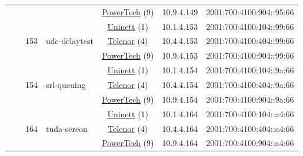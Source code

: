 \begin{small}
\begin{center}
\begin{longtable}{|c|c|c|c|c|c|c|c|}
  &  &  &  & \multicolumn{2}{|c|}{\tiny{\href{http://www.powertech.no}{PowerTech} (9)}} & \tiny{10.9.4.149} & \tiny{2001:700:4100:904::95:66} \\* \cline{3-3}\cline{4-4}\cline{5-5}\cline{6-6}\cline{7-7}\cline{8-8}
  &  & \multirow{3}{*}{\tiny{153}} & \multicolumn{1}{|l|}{\multirow{3}{*}{\tiny{ude-delaytest}}} & \multicolumn{2}{|c|}{\tiny{\href{https://www.uninett.no}{Uninett} (1)}} & \tiny{10.1.4.153} & \tiny{2001:700:4100:104::99:66} \\* \cline{5-5}\cline{6-6}\cline{7-7}\cline{8-8}
  &  &  &  & \multicolumn{2}{|c|}{\tiny{\href{https://www.telenor.no}{Telenor} (4)}} & \tiny{10.4.4.153} & \tiny{2001:700:4100:404::99:66} \\* \cline{5-5}\cline{6-6}\cline{7-7}\cline{8-8}
  &  &  &  & \multicolumn{2}{|c|}{\tiny{\href{http://www.powertech.no}{PowerTech} (9)}} & \tiny{10.9.4.153} & \tiny{2001:700:4100:904::99:66} \\* \cline{3-3}\cline{4-4}\cline{5-5}\cline{6-6}\cline{7-7}\cline{8-8}
  &  & \multirow{3}{*}{\tiny{154}} & \multicolumn{1}{|l|}{\multirow{3}{*}{\tiny{srl-queuing}}} & \multicolumn{2}{|c|}{\tiny{\href{https://www.uninett.no}{Uninett} (1)}} & \tiny{10.1.4.154} & \tiny{2001:700:4100:104::9a:66} \\* \cline{5-5}\cline{6-6}\cline{7-7}\cline{8-8}
  &  &  &  & \multicolumn{2}{|c|}{\tiny{\href{https://www.telenor.no}{Telenor} (4)}} & \tiny{10.4.4.154} & \tiny{2001:700:4100:404::9a:66} \\* \cline{5-5}\cline{6-6}\cline{7-7}\cline{8-8}
  &  &  &  & \multicolumn{2}{|c|}{\tiny{\href{http://www.powertech.no}{PowerTech} (9)}} & \tiny{10.9.4.154} & \tiny{2001:700:4100:904::9a:66} \\* \cline{3-3}\cline{4-4}\cline{5-5}\cline{6-6}\cline{7-7}\cline{8-8}
  &  & \multirow{3}{*}{\tiny{164}} & \multicolumn{1}{|l|}{\multirow{3}{*}{\tiny{tuda-sereon}}} & \multicolumn{2}{|c|}{\tiny{\href{https://www.uninett.no}{Uninett} (1)}} & \tiny{10.1.4.164} & \tiny{2001:700:4100:104::a4:66} \\* \cline{5-5}\cline{6-6}\cline{7-7}\cline{8-8}
  &  &  &  & \multicolumn{2}{|c|}{\tiny{\href{https://www.telenor.no}{Telenor} (4)}} & \tiny{10.4.4.164} & \tiny{2001:700:4100:404::a4:66} \\* \cline{5-5}\cline{6-6}\cline{7-7}\cline{8-8}
  &  &  &  & \multicolumn{2}{|c|}{\tiny{\href{http://www.powertech.no}{PowerTech} (9)}} & \tiny{10.9.4.164} & \tiny{2001:700:4100:904::a4:66} \\* \cline{3-3}\cline{4-4}\cline{5-5}\cline{6-6}\cline{7-7}\cline{8-8}

\end{longtable}
\end{center}
\end{small}
